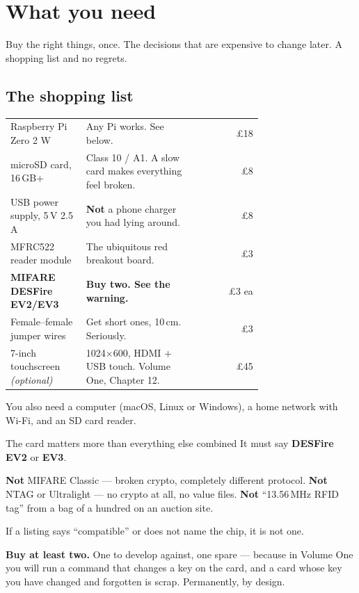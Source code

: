 \chapter{What you need}
\label{ch:need}

\chapterbrief
  {Buy the right things, once.}
  {The decisions that are expensive to change later.}
  {A shopping list and no regrets.}

\section{The shopping list}

\begin{center}\small
\begin{tabular}{@{}L{0.30\linewidth}L{0.42\linewidth}r@{}}
\toprule
{} &  &  \\
\midrule
Raspberry Pi Zero 2 W & Any Pi works. See below. & \pounds18 \\
microSD card, 16\,GB+ & Class 10 / A1. A slow card makes everything feel broken. & \pounds8 \\
USB power supply, 5\,V 2.5\,A & \textbf{Not} a phone charger you had lying around. & \pounds8 \\
MFRC522 reader module & The ubiquitous red breakout board. & \pounds3 \\
\textbf{MIFARE DESFire EV2/EV3} & \textbf{Buy two. See the warning.} & \pounds3 ea \\
Female--female jumper wires & Get short ones, 10\,cm. Seriously. & \pounds3 \\
7-inch touchscreen \emph{(optional)} & 1024$\times$600, HDMI $+$ USB touch. Volume One, Chapter 12. & \pounds45 \\
\bottomrule
\end{tabular}
\end{center}

You also need a computer (macOS, Linux or Windows), a home network with Wi-Fi,
and an SD card reader.

\begin{trap}{The card matters more than everything else combined}
It must say \textbf{DESFire EV2} or \textbf{EV3}.

\textbf{Not} MIFARE Classic --- broken crypto, completely different protocol.
\textbf{Not} NTAG or Ultralight --- no crypto at all, no value files.
\textbf{Not} ``13.56\,MHz RFID tag'' from a bag of a hundred on an auction site.

If a listing says ``compatible'' or does not name the chip, it is not one.

\textbf{Buy at least two.} One to develop against, one spare --- because in
Volume One you will run a command that changes a key on the card, and a card
whose key you have changed and forgotten is scrap. Permanently, by design.
\end{trap}

